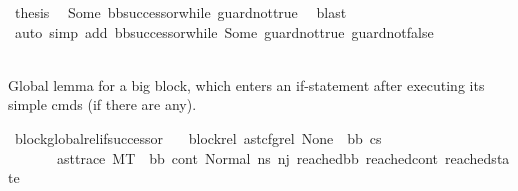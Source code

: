 \begin{isabellebody}
\ {\isacharquery}{\kern0pt}thesis\ \isamarkupfalse%
\ Some\ bb{\isacharunderscore}{\kern0pt}successor{\isacharunderscore}{\kern0pt}while\ guard{\isacharunderscore}{\kern0pt}not{\isacharunderscore}{\kern0pt}true\ \isamarkupfalse%
\ blast\isanewline
\ \ \ \ \ \ \ \ \ \ \isamarkupfalse%
\ {\isacharparenleft}{\kern0pt}auto\ simp\ add{\isacharcolon}{\kern0pt}\ bb{\isacharunderscore}{\kern0pt}successor{\isacharunderscore}{\kern0pt}while\ Some\ guard{\isacharunderscore}{\kern0pt}not{\isacharunderscore}{\kern0pt}true\ guard{\isacharunderscore}{\kern0pt}not{\isacharunderscore}{\kern0pt}false{\isacharparenright}{\kern0pt}\isanewline
\ \ \ \ \ \ \ \ \isamarkupfalse%
\isanewline
\ \ \ \ \ \ \isamarkupfalse%
\isanewline
\ \ \ \ \isamarkupfalse%
\isanewline
\ \ \isamarkupfalse%
\isanewline
{}\isamarkupfalse%
%
\endisatagproof
{\isafoldproof}%
%
\isadelimproof
%
\endisadelimproof
%
\begin{isamarkuptext}%
Global lemma for a big block, which enters an if-statement after executing its simple cmds (if there are any).%
\end{isamarkuptext}\isamarkuptrue%
\isamarkupfalse%
\ block{\isacharunderscore}{\kern0pt}global{\isacharunderscore}{\kern0pt}rel{\isacharunderscore}{\kern0pt}if{\isacharunderscore}{\kern0pt}successor{\isacharcolon}{\kern0pt}\isanewline
\ \ \ block{\isacharunderscore}{\kern0pt}rel{\isacharcolon}{\kern0pt}\ {\isachardoublequoteopen}ast{\isacharunderscore}{\kern0pt}cfg{\isacharunderscore}{\kern0pt}rel\ None\ {\isacharbrackleft}{\kern0pt}{\isacharbrackright}{\kern0pt}\ bb\ cs{}{\isachardoublequoteclose}\isanewline
\ \ \ \ \ \ \ ast{\isacharunderscore}{\kern0pt}trace{\isacharcolon}{\kern0pt}\ {\isachardoublequoteopen}M{\isacharcomma}{\kern0pt}{\isasymLambda}{\isacharcomma}{\kern0pt}{\isasymGamma}{\isacharcomma}{\kern0pt}{\isasymOmega}{\isacharcomma}{\kern0pt}T\ {\isasymturnstile}\ {\isacharparenleft}{\kern0pt}bb{\isacharcomma}{\kern0pt}\ cont{}{\isacharcomma}{\kern0pt}\ {\isacharparenleft}{\kern0pt}Normal\ ns{}{\isacharparenright}{\kern0pt}{\isacharparenright}{\kern0pt}\ {\isacharminus}{\kern0pt}n{\isasymlongrightarrow}{\isacharcircum}{\kern0pt}j\ {\isacharparenleft}{\kern0pt}reached{\isacharunderscore}{\kern0pt}bb{\isacharcomma}{\kern0pt}\ reached{\isacharunderscore}{\kern0pt}cont{\isacharcomma}{\kern0pt}\ reached{\isacharunderscore}{\kern0pt}state{\isacharparenright}{\kern0pt}{\isachardoublequoteclose}\isanewline

\end{isabellebody}
